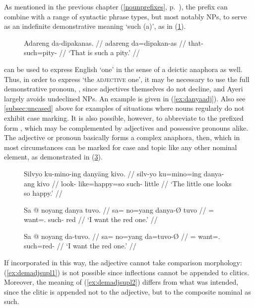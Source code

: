 As mentioned in the previous chapter (\autoref{nounprefixes},
p.~\pageref{nounprefixes}), the prefix  can combine
with a range of syntactic phrase types, but most notably NPs, to serve as an
indefinite demonstrative meaning `such (a)', as in (\ref{ex:danoun}).

\begin{figure}[h]
\ex\label{ex:danoun}%
\begingl
	\gla Adareng da-dipakanas. //
	\glb adareng da=dipakan-as //
	\glc that-\AargI{} such=pity-\Parg{} //
	\glft `That is such a pity.' //
\endgl
\xe
\end{figure}

 can be used to express English `one' in the sense of a deictic
anaphora as well. Thus, in order to express `the \textsc{adjective} one', it
may be necessary to use the full demonstrative pronoun, ,
since adjectives themselves do not decline, and Ayeri largely avoids undeclined
NPs. An example is given in (\ref{ex:danyaadj}). Also see
\autoref{subsec:uncased} above for examples of situations where nouns regularly
do not exhibit case marking. It is also possible, however, to abbreviate
 to the prefixed form , which may be
complemented by adjectives and possessive pronouns alike. The adjective or
pronoun basically forms a complex anaphora, then, which in most circumstances
can be marked for case and topic like any other nominal element, as
demonstrated in (\ref{ex:redone}).

\begin{figure}
\pex\label{ex:danyaadj}
\a\begingl
	\gla Silvyo ku-mino-ing danyāng kivo. //
	\glb silv-yo ku=mino=ing danya-ang kivo //
	\glc look-\TsgN{} like=happy=so such-\Aarg{} little //
	\glft `The little one looks so happy.' //
\endgl

\a\label{ex:danyatop}\begingl
	\gla Sa @ noyang danya tuvo. //
	\glb sa= no=yang danya-Ø tuvo //
	\glc \PatT{}= want=\Fsg{}.\Aarg{} such-\Top{} red //
	\glft `I want the red one.' //
\endgl
\xe
\end{figure}

\begin{figure}[h]
\ex\label{ex:redone}\begingl
	\gla Sa @ noyang da-tuvo. //
	\glb sa= no=yang da=tuvo-Ø //
	\glc \PatT{}= want=\Fsg{}.\Aarg{} such=red-\Top{} //
	\glft `I want the red one.' //
\endgl\xe
\end{figure}

If incorporated in this way, the adjective cannot take comparison morphology:
(\ref{ex:demadjsupl1}) is not possible since inflections cannot be appended to
clitics.
Moreover, the meaning of (\ref{ex:demadjsupl2}) differs from what was
intended, since the  clitic is appended not to the adjective,
but to the composite nominal as such.

